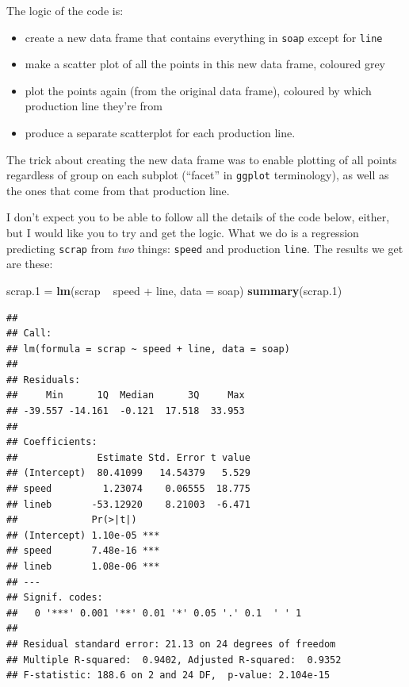 \documentclass[]{tufte-book}
\newenvironment{Shaded}{}{}
\newcommand{\DataTypeTok}[1]{\textcolor[rgb]{0.56,0.13,0.00}{#1}}
\newcommand{\FloatTok}[1]{\textcolor[rgb]{0.25,0.63,0.44}{#1}}
\newcommand{\KeywordTok}[1]{\textcolor[rgb]{0.00,0.44,0.13}{\textbf{#1}}}
\newcommand{\NormalTok}[1]{#1}
\newcommand{\OperatorTok}[1]{\textcolor[rgb]{0.40,0.40,0.40}{#1}}
\newcommand{\StringTok}[1]{\textcolor[rgb]{0.25,0.44,0.63}{#1}}
\theoremstyle{definition}
\theoremstyle{definition}
\theoremstyle{definition}
\theoremstyle{remark}
\begin{document}
The logic of the code is:

\begin{itemize}
\item
  create a new data frame that contains everything in \texttt{soap}
  except for \texttt{line}
\item
  make a scatter plot of all the points in this new data frame, coloured
  grey
\item
  plot the points again (from the original data frame), coloured by
  which production line they're from
\item
  produce a separate scatterplot for each production line.
\end{itemize}

The trick about creating the new data frame was to enable plotting of
all points regardless of group on each subplot (``facet'' in
\texttt{ggplot} terminology), as well as the ones that come from that
production line.

I don't expect you to be able to follow all the details of the code
below, either, but I would like you to try and get the logic. What we do
is a regression predicting \texttt{scrap} from \emph{two} things:
\texttt{speed} and production \texttt{line}. The results we get are
these:

\begin{Shaded}
\begin{Highlighting}[]
\NormalTok{scrap}\FloatTok{.1}\NormalTok{ =}\StringTok{ }\KeywordTok{lm}\NormalTok{(scrap }\OperatorTok{~}\StringTok{ }\NormalTok{speed }\OperatorTok{+}\StringTok{ }\NormalTok{line, }\DataTypeTok{data =}\NormalTok{ soap)}
\KeywordTok{summary}\NormalTok{(scrap}\FloatTok{.1}\NormalTok{)}
\end{Highlighting}
\end{Shaded}

\begin{verbatim}
## 
## Call:
## lm(formula = scrap ~ speed + line, data = soap)
## 
## Residuals:
##     Min      1Q  Median      3Q     Max 
## -39.557 -14.161  -0.121  17.518  33.953 
## 
## Coefficients:
##              Estimate Std. Error t value
## (Intercept)  80.41099   14.54379   5.529
## speed         1.23074    0.06555  18.775
## lineb       -53.12920    8.21003  -6.471
##             Pr(>|t|)    
## (Intercept) 1.10e-05 ***
## speed       7.48e-16 ***
## lineb       1.08e-06 ***
## ---
## Signif. codes:  
##   0 '***' 0.001 '**' 0.01 '*' 0.05 '.' 0.1  ' ' 1
## 
## Residual standard error: 21.13 on 24 degrees of freedom
## Multiple R-squared:  0.9402, Adjusted R-squared:  0.9352 
## F-statistic: 188.6 on 2 and 24 DF,  p-value: 2.104e-15
\end{verbatim}
\end{document}
